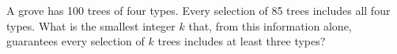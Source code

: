 A grove has 100 trees of four types. Every selection of 85 trees includes all four types. What is the smallest integer $k$ that, from this information alone, guarantees every selection of $k$ trees includes at least three types?
